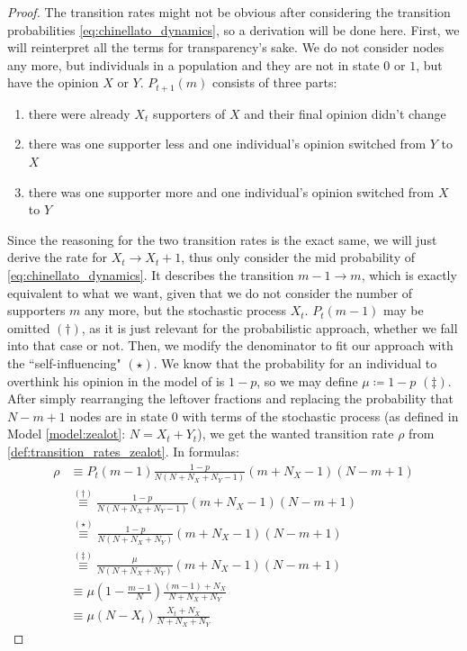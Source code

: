 \documentclass[12pt,a4paper,twoside]{article}
\begin{document}
\begin{proof}
The transition rates might not be obvious after considering the transition probabilities \eqref{eq:chinellato_dynamics}, so a derivation will be done here. First, we will reinterpret all the terms for transparency's sake. We do not consider nodes any more, but individuals in a population and they are not in state $0$ or $1$, but have the opinion $X$ or $Y$. $P_{t+1}\left(m\right)$ consists of three parts: 
\begin{enumerate}
	\item there were already $X_t$ supporters of $X$ and their final opinion didn't change
	\item there was one supporter less and one individual's opinion switched from $Y$ to $X$
	\item there was one supporter more and one individual's opinion switched from $X$ to $Y$
\end{enumerate}
Since the reasoning for the two transition rates is the exact same, we will just derive the rate for $X_t \rightarrow X_t + 1$, thus only consider the mid probability of \eqref{eq:chinellato_dynamics}. It describes the transition $m -1 \rightarrow m$, which is exactly equivalent to what we want, given that we do not consider the number of supporters $m$ any more, but the stochastic process $X_t$. $P_t \left(m-1\right)$ may be omitted $(\dagger)$, as it is just relevant for the probabilistic approach, whether we fall into that case or not. Then, we modify the denominator to fit our approach with the ``self-influencing" $(\star)$. We know that the probability for an individual to overthink his opinion in the model of \cite{Aguiar2011, Chinellato2015} is $1-p$, so we may define $\mu \coloneqq 1-p$ $(\ddagger)$. After simply rearranging the leftover fractions and replacing the probability that $N - m + 1$ nodes are in state $0$ with terms of the stochastic process (as defined in Model \ref{model:zealot}: $N = X_t + Y_t$), we get the wanted transition rate $\rho$ from \eqref{def:transition_rates_zealot}. In formulas:
\begin{align*}
	\rho &\equiv P_t\left(m-1\right)\frac{1-p}{N\left(N+N_X+N_Y-1\right)}\left(m+N_X-1\right)\left(N-m+1\right)\\
	&\overset{(\dagger)}{\equiv} \frac{1-p}{N\left(N+N_X+N_Y-1\right)}\left(m+N_X-1\right)\left(N-m+1\right)\\
	&\overset{(\star)}{\equiv} \frac{1-p}{N(N+N_X+N_Y)}\left(m+N_X-1\right)\left(N-m+1\right)\\
	&\overset{(\ddagger)}{\equiv} \frac{\mu}{N(N+N_X+N_Y)}\left(m+N_X-1\right)\left(N-m+1\right)\\
	&\equiv \mu \left(1-\frac{m-1}{N}\right)\frac{\left(m-1\right) + N_X}{N + N_X + N_Y}\\
	&\equiv \mu\left(N-X_t\right)\frac{X_t + N_X}{N + N_X + N_Y}
\end{align*}
\end{proof}
\end{document}
